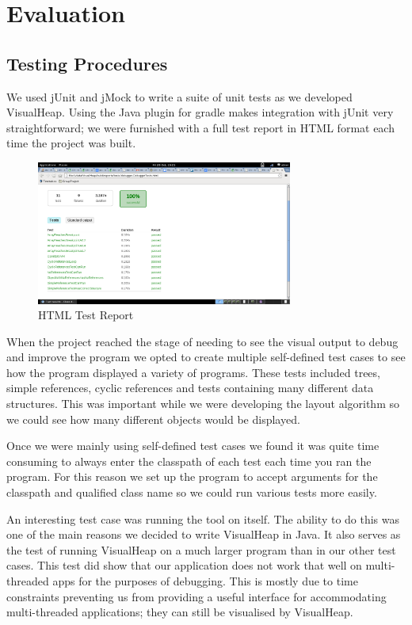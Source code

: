 \documentclass[11pt, a4paper]{report}
\begin{document}
\chapter{Evaluation}

\section{Testing Procedures}

We used jUnit and jMock to write a suite of unit tests as we developed VisualHeap. Using the Java plugin for gradle makes integration with jUnit very straightforward; we were furnished with a full test report in HTML format each time the project was built.

\begin{figure}[h]
        \centering
        \includegraphics[width=0.75\textwidth]{images/final/testresults.png}
        \caption{HTML Test Report}
\end{figure}

When the project reached the stage of needing to see the visual output to debug and improve the program we opted to create multiple self-defined test cases to see how the program displayed a variety of programs. These tests included trees, simple references, cyclic references and tests containing many different data structures. This was important while we were developing the layout algorithm so we could see how many different objects would be displayed.

Once we were mainly using self-defined test cases we found it was quite time consuming to always enter the classpath of each test each time you ran the program. For this reason we set up the program to accept arguments for the classpath and qualified class name so we could run various tests more easily.

An interesting test case was running the tool on itself. The ability to do this was one of the main reasons we decided to write VisualHeap in Java. It also serves as the test of running VisualHeap on a much larger program than in our other test cases. This test did show that our application does not work that well on multi-threaded apps for the purposes of debugging. This is mostly due to time constraints preventing us from providing a useful interface for accommodating multi-threaded applications; they can still be visualised by VisualHeap.
\end{document}
